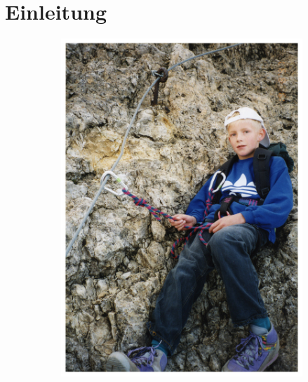 \section{Einleitung}

\begin{frame}[standout]
\begin{figure}[h]
	\centering
	\begin{subfigure}[t]{0.49\columnwidth}
		\centering
		\includegraphics[angle=7,width=\textwidth]{include/images/1997.jpg}
	\end{subfigure}
	\hspace*{\fill}
	\begin{subfigure}[t]{0.49\columnwidth}
		\centering

\end{subfigure}
\end{figure}
\end{frame}
